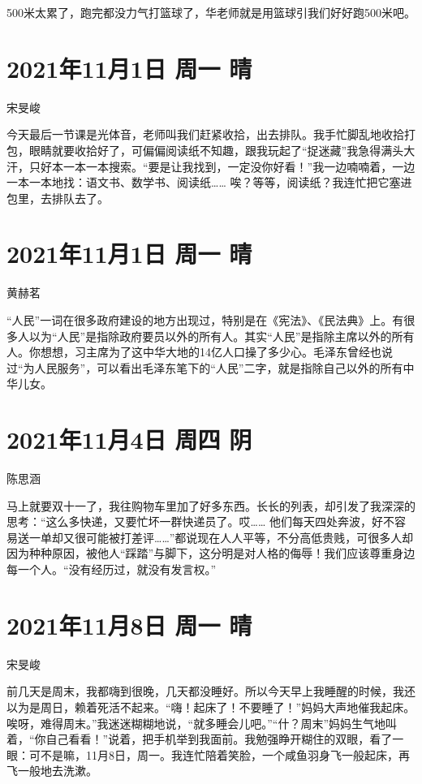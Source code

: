 500米太累了，跑完都没力气打篮球了，华老师就是用篮球引我们好好跑500米吧。

\section{2021年11月1日 周一 晴}

宋旻峻

今天最后一节课是光体音，老师叫我们赶紧收拾，出去排队。我手忙脚乱地收拾打包，眼睛就要收拾好了，可偏偏阅读纸不知趣，跟我玩起了“捉迷藏”我急得满头大汗，只好本一本一本搜索。“要是让我找到，一定没你好看！”我一边喃喃着，一边一本一本地找：语文书、数学书、阅读纸…… 唉？等等，阅读纸？我连忙把它塞进包里，去排队去了。

\section{2021年11月1日 周一 晴}

黄赫茗

“人民”一词在很多政府建设的地方出现过，特别是在《宪法》、《民法典》上。有很多人以为“人民”是指除政府要员以外的所有人。其实“人民”是指除主席以外的所有人。你想想，习主席为了这中华大地的14亿人口操了多少心。毛泽东曾经也说过“为人民服务”，可以看出毛泽东笔下的“人民”二字，就是指除自己以外的所有中华儿女。

\section{2021年11月4日 周四 阴}

陈思涵

马上就要双十一了，我往购物车里加了好多东西。长长的列表，却引发了我深深的思考：“这么多快递，又要忙坏一群快递员了。哎…… 他们每天四处奔波，好不容易送一单却又很可能被打差评……”都说现在人人平等，不分高低贵贱，可很多人却因为种种原因，被他人“踩踏”与脚下，这分明是对人格的侮辱！我们应该尊重身边每一个人。“没有经历过，就没有发言权。”

\section{2021年11月8日 周一 晴}

宋旻峻

前几天是周末，我都嗨到很晚，几天都没睡好。所以今天早上我睡醒的时候，我还以为是周日，赖着死活不起来。“嗨！起床了！不要睡了！”妈妈大声地催我起床。唉呀，难得周末。”我迷迷糊糊地说，“就多睡会儿吧。”“什？周末”妈妈生气地叫着，“你自己看看！”说着，把手机举到我面前。我勉强睁开糊住的双眼，看了一眼：可不是嘛，11月8日，周一。我连忙陪着笑脸，一个咸鱼羽身飞一般起床，再飞一般地去洗漱。

